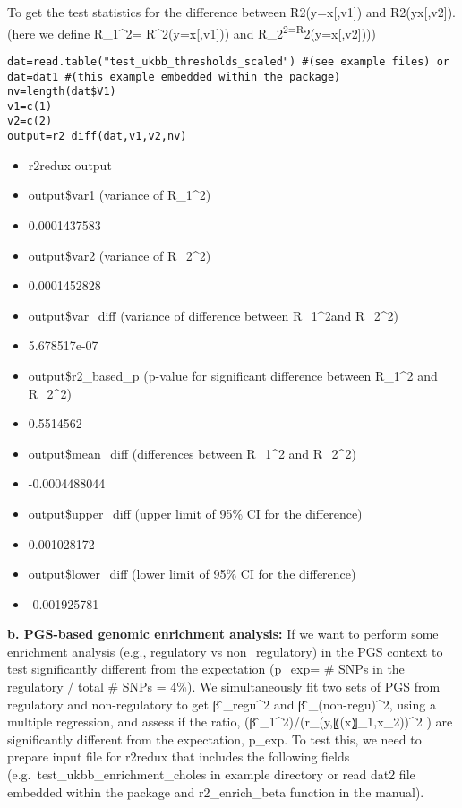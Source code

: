 \documentclass[
]{article}
\providecommand{\tightlist}{%
  \setlength{\itemsep}{0pt}\setlength{\parskip}{0pt}}
\begin{document}
To get the test statistics for the difference between R2(y=x{[},v1{]})
and R2(yx{[},v2{]}). (here we define R\_1\^{}2= R\^{}2(y=x{[},v1{]}))
and R\_2\textsuperscript{2=R}2(y=x{[},v2{]})))

\begin{verbatim}
dat=read.table("test_ukbb_thresholds_scaled") #(see example files) or
dat=dat1 #(this example embedded within the package)
nv=length(dat$V1)
v1=c(1)
v2=c(2)
output=r2_diff(dat,v1,v2,nv)
\end{verbatim}

\begin{itemize}
\tightlist
\item
  r2redux output
\item
  output\$var1 (variance of R\_1\^{}2)
\item
  0.0001437583
\item
  output\$var2 (variance of R\_2\^{}2)
\item
  0.0001452828
\item
  output\$var\_diff (variance of difference between R\_1\^{}2and
  R\_2\^{}2)
\item
  5.678517e-07
\item
  output\$r2\_based\_p (p-value for significant difference between
  R\_1\^{}2 and R\_2\^{}2)
\item
  0.5514562
\item
  output\$mean\_diff (differences between R\_1\^{}2 and R\_2\^{}2)
\item
  -0.0004488044
\item
  output\$upper\_diff (upper limit of 95\% CI for the difference)
\item
  0.001028172
\item
  output\$lower\_diff (lower limit of 95\% CI for the difference)
\item
  -0.001925781
\end{itemize}

\textbf{b. PGS-based genomic enrichment analysis:} If we want to perform
some enrichment analysis (e.g., regulatory vs non\_regulatory) in the
PGS context to test significantly different from the expectation
(p\_exp= \# SNPs in the regulatory / total \# SNPs = 4\%). We
simultaneously fit two sets of PGS from regulatory and non-regulatory to
get β ̂\_regu\^{}2 and β ̂\_(non-regu)\^{}2, using a multiple regression,
and assess if the ratio, (β ̂\_1\^{}2)/(r\_(y,〖(x〗\_1,x\_2))\^{}2 ) are
significantly different from the expectation, p\_exp. To test this, we
need to prepare input file for r2redux that includes the following
fields (e.g.~test\_ukbb\_enrichment\_choles in example directory or read
dat2 file embedded within the package and r2\_enrich\_beta function in
the manual).
\end{document}
